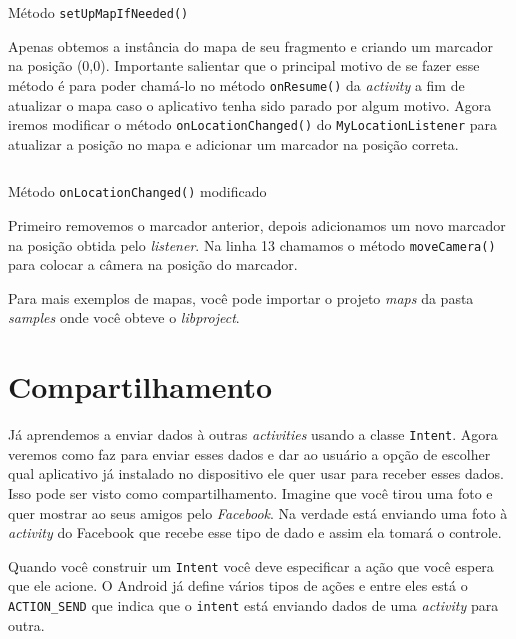 \documentclass[a4paper,12pt,brazil,oneside]{book}
\begin{document}
		\begin{listing}[H]
		\inputminted[linenos=true,fontsize=\small,frame=lines, framesep=2mm, tabsize=2,numbersep=5pt]{java}{src/api/maps/setupif.java}
		\caption{Método \texttt{setUpMapIfNeeded()}}
		\label{code:setupif}
		\end{listing} 	

		Apenas obtemos a instância do mapa de seu fragmento e criando um marcador na posição (0,0). Importante salientar que o principal motivo de se fazer esse método é para poder chamá-lo no método \texttt{onResume()} da \emph{activity} a fim de atualizar o mapa caso o aplicativo tenha sido parado por algum motivo. Agora iremos modificar o método \texttt{onLocationChanged()} do \texttt{MyLocationListener} para atualizar a posição no mapa e adicionar um marcador na posição correta.
		
		\begin{listing}[H]
		\inputminted[linenos=true,fontsize=\small,frame=lines, framesep=2mm, tabsize=2,numbersep=5pt]{java}{src/api/maps/onlocmod.java}
		\caption{Método \texttt{onLocationChanged()} modificado}
		\label{code:onlocmod}
		\end{listing} 	
		
		Primeiro removemos o marcador anterior, depois adicionamos um novo marcador na posição obtida pelo \emph{listener}. Na linha 13 chamamos o método \texttt{moveCamera()} para colocar a câmera na posição do marcador. 

		Para mais exemplos de mapas, você pode importar o projeto \emph{maps} da pasta \emph{samples} onde você obteve o \emph{libproject}.
	
\chapter{Compartilhamento} 

		Já aprendemos a enviar dados à outras \emph{activities} usando a classe \texttt{Intent}. Agora veremos como faz para enviar esses dados e dar ao usuário a opção de escolher qual aplicativo já instalado no dispositivo ele quer usar para receber esses dados. Isso pode ser visto como compartilhamento. Imagine que você tirou uma foto e quer mostrar ao seus amigos pelo \emph{Facebook}. Na verdade está enviando uma foto à \emph{activity} do Facebook que recebe esse tipo de dado e assim ela tomará o controle.

		Quando você construir um \texttt{Intent} você deve especificar a ação que você espera que ele acione. O Android já define vários tipos de ações e entre eles está o \texttt{ACTION\_SEND} que indica que o \texttt{intent} está enviando dados de uma \emph{activity} para outra. 
\end{document}
